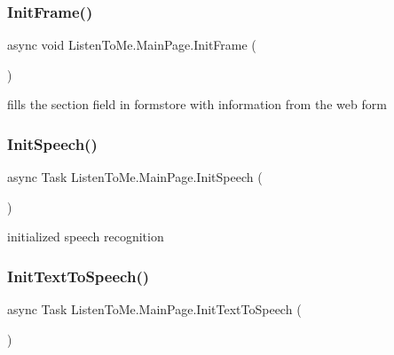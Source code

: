 \subsubsection{\texorpdfstring{Init\+Frame()}{InitFrame()}}
{\footnotesize\ttfamily async void Listen\+To\+Me.\+Main\+Page.\+Init\+Frame (\begin{DoxyParamCaption}{ }\end{DoxyParamCaption})\hspace{0.3cm}{\ttfamily [private]}}



fills the section field in formstore with information from the web form 

\mbox{\label{class_listen_to_me_1_1_main_page_ac541bec23372af9da39117384c6b177e}} 
\subsubsection{\texorpdfstring{Init\+Speech()}{InitSpeech()}}
{\footnotesize\ttfamily async Task Listen\+To\+Me.\+Main\+Page.\+Init\+Speech (\begin{DoxyParamCaption}{ }\end{DoxyParamCaption})\hspace{0.3cm}{\ttfamily [private]}}



initialized speech recognition 

\mbox{\label{class_listen_to_me_1_1_main_page_a5d7ee17d9ee59cfc8ddee9731415c4c3}} 
\subsubsection{\texorpdfstring{Init\+Text\+To\+Speech()}{InitTextToSpeech()}}
{\footnotesize\ttfamily async Task Listen\+To\+Me.\+Main\+Page.\+Init\+Text\+To\+Speech (\begin{DoxyParamCaption}{ }\end{DoxyParamCaption})\hspace{0.3cm}{\ttfamily [private]}}


